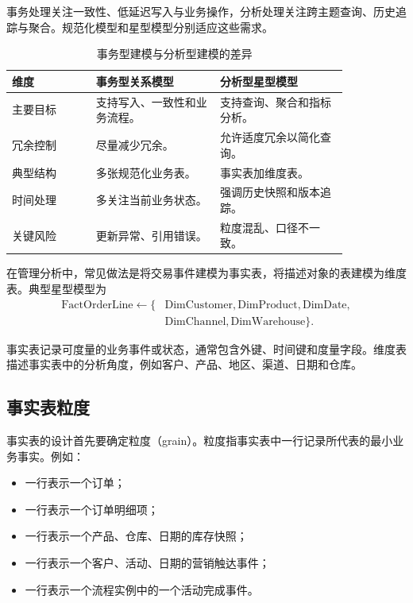 事务处理关注一致性、低延迟写入与业务操作，分析处理关注跨主题查询、历史追踪与聚合。规范化模型和星型模型分别适应这些需求。

\begin{table}[htbp]
\centering
\caption{事务型建模与分析型建模的差异}
\begin{tabular}{P{0.21\linewidth}P{0.31\linewidth}P{0.32\linewidth}}
\toprule
{}
维度 & 事务型关系模型 & 分析型星型模型\\
\midrule
主要目标 & 支持写入、一致性和业务流程。 & 支持查询、聚合和指标分析。\\
冗余控制 & 尽量减少冗余。 & 允许适度冗余以简化查询。\\
典型结构 & 多张规范化业务表。 & 事实表加维度表。\\
时间处理 & 多关注当前业务状态。 & 强调历史快照和版本追踪。\\
关键风险 & 更新异常、引用错误。 & 粒度混乱、口径不一致。\\
\bottomrule
\end{tabular}
\end{table}

在管理分析中，常见做法是将交易事件建模为事实表，将描述对象的表建模为维度表。典型星型模型为
\[
\begin{aligned}
\text{FactOrderLine}\leftarrow
\{&\text{DimCustomer},\text{DimProduct},\text{DimDate},\\
&\text{DimChannel},\text{DimWarehouse}\}.
\end{aligned}
\]

\begin{definition}[事实表与维度表]
事实表记录可度量的业务事件或状态，通常包含外键、时间键和度量字段。维度表描述事实表中的分析角度，例如客户、产品、地区、渠道、日期和仓库。
\end{definition}

\subsection{事实表粒度}

事实表的设计首先要确定粒度（grain）。粒度指事实表中一行记录所代表的最小业务事实。例如：
\begin{itemize}
  \item 一行表示一个订单；
  \item 一行表示一个订单明细项；
  \item 一行表示一个产品、仓库、日期的库存快照；
  \item 一行表示一个客户、活动、日期的营销触达事件；
  \item 一行表示一个流程实例中的一个活动完成事件。
\end{itemize}

